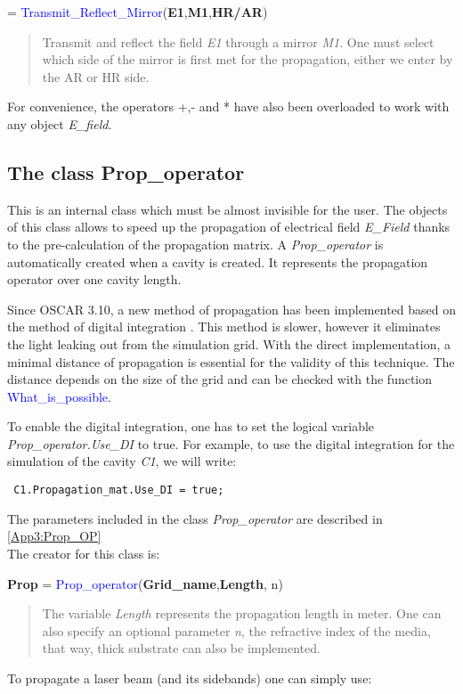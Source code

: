= \textcolor{blue}{Transmit\_Reflect\_Mirror}(\textbf{E1},\textbf{M1},\textbf{HR/AR})
\vspace*{-0.2cm}
\begin{quote}
Transmit and reflect the field \textsl{E1} through a mirror \textsl{M1}. One must select which side of the mirror is first met for the propagation, either we enter by the AR or HR side.
\end{quote}

For convenience, the operators +,- and * have also been overloaded to work with any object \textsl{E\_field}.




\subsection{The class Prop\_operator}
\label{Sec:DI}
This is an internal class which must be almost invisible for the user. The objects of this class allows to speed up the propagation of electrical field \textsl{E\_Field} thanks to the pre-calculation of the propagation matrix. A \textsl{Prop\_operator} is automatically created when a cavity is created. It represents the propagation operator over one cavity length.

Since OSCAR 3.10, a new method of propagation has been implemented based on the method of digital integration \cite{DI_paper}. This method is slower, however it eliminates the light leaking out from the simulation grid. With the direct implementation, a minimal distance of propagation is essential for the validity of this technique. The distance depends on the size of the grid and can be checked with the function \textcolor{blue}{What\_is\_possible}.

To enable the digital integration, one has to set the logical variable \textsl{Prop\_operator.Use\_DI} to true. For example, to use the digital integration for the simulation of the cavity \textsl{C1}, we will write:

\verb? C1.Propagation_mat.Use_DI = true; ?

The parameters included in the class \textsl{Prop\_operator} are described in \ref{App3:Prop_OP}\\


The creator for this class is:

\noindent \textbf{Prop} = \textcolor{blue}{Prop\_operator}(\textbf{Grid\_name},\textbf{Length}, n)

\vspace*{-0.2cm}
\begin{quote}
The variable \textsl{Length} represents the propagation length in meter. One can also specify an optional parameter \textsl{n}, the refractive index of the media, that way, thick substrate can also be implemented.
\end{quote}
To propagate a laser beam (and its sidebands) one can simply use:

